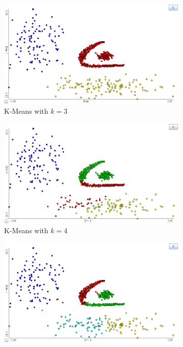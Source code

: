 \documentclass[
	a4paper,
	english,
	twoside,
	openright,               
	11pt                            
	]{report}
\begin{document}
\begin{figure}[h]
\centering
\begin{subfigure}[t]{.49\textwidth}
  \centering
  \includegraphics[width=.98\linewidth]{unob_k3}
  \caption{K-Means with $k=3$}
  \label{fig:unob_k3}
\end{subfigure}
\hfill
\begin{subfigure}[t]{.49\textwidth}
  \centering
  \includegraphics[width=.98\linewidth]{unob_k4ex}
  \caption{K-Means with $k=4$}
  \label{fig:unob_k4ex}
\end{subfigure}
\medskip
\begin{subfigure}[t]{.49\textwidth}
  \centering
  \includegraphics[width=.98\linewidth]{unob_k5ex}

\end{subfigure}
\end{figure}
\end{document}
